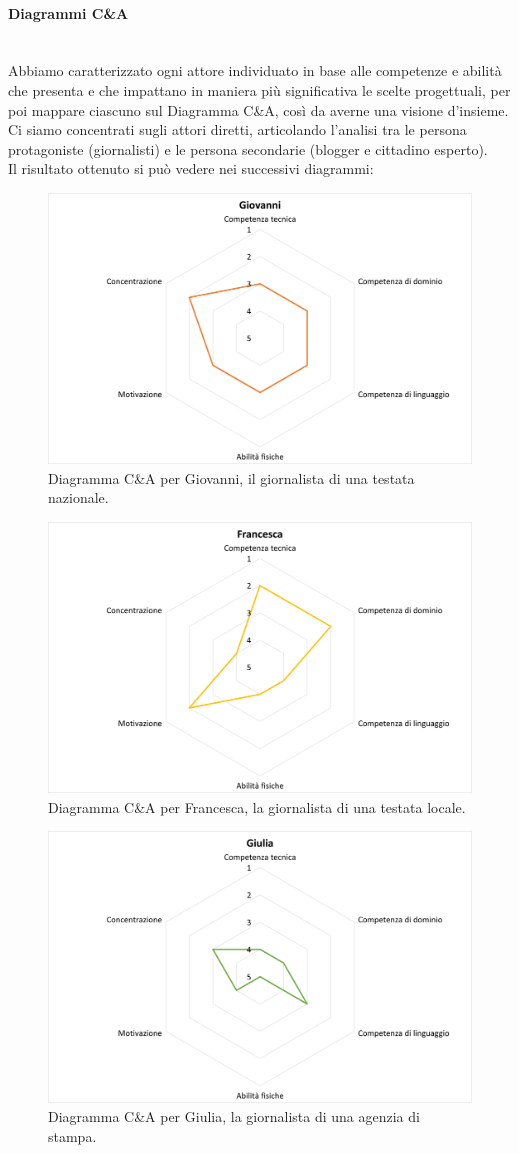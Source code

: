 \paragraph{Diagrammi C\&A}\mbox{}\\
Abbiamo caratterizzato ogni attore individuato in base alle competenze e abilità che presenta e che impattano in maniera più significativa le scelte progettuali, per poi mappare ciascuno sul Diagramma C\&A, così da averne una visione d'insieme.
Ci siamo concentrati sugli attori diretti, articolando l'analisi tra le persona protagoniste (giornalisti) e le persona secondarie (blogger e cittadino esperto).\\
Il risultato ottenuto si può vedere nei successivi diagrammi:
\begin{figure}[H]
    \centering
    \includegraphics[width=0.5\columnwidth]{assets/images/proposta-design/caos/giovanni}
    \caption{Diagramma C\&A per Giovanni, il giornalista di una testata nazionale.}
\end{figure}

\begin{figure}[H]
    \centering
    \includegraphics[width=0.5\columnwidth]{assets/images/proposta-design/caos/francesca}
    \caption{Diagramma C\&A per Francesca, la giornalista di una testata locale.}
\end{figure}

\begin{figure}[H]
    \centering
    \includegraphics[width=0.5\columnwidth]{assets/images/proposta-design/caos/giulia}
    \caption{Diagramma C\&A per Giulia, la giornalista di una agenzia di stampa.}
\end{figure}

